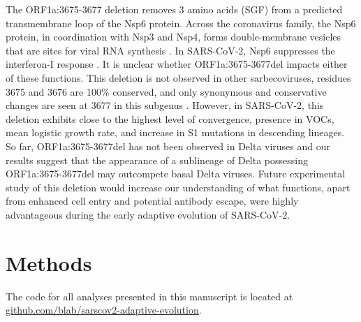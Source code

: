\documentclass[11pt,oneside,letterpaper]{article}
\begin{document}
The ORF1a:3675-3677 deletion removes 3 amino acids (SGF) from a predicted transmembrane loop \cite{Benvenuto2020-uc} of the Nsp6 protein.
Across the coronavirus family, the Nsp6 protein, in coordination with Nsp3 and Nsp4, forms double-membrane vesicles that are sites for viral RNA synthesis \cite{Snijder2020-vx}.
In SARS-CoV-2, Nsp6 suppresses the interferon-I response \cite{Xia2020-zs}. It is unclear whether ORF1a:3675-3677del impacts either of these functions.
This deletion is not observed in other sarbecoviruses, residues 3675 and 3676 are 100\% conserved, and only synonymous and conservative changes are seen at 3677 in this subgenus \cite{Jungreis2021-vv}.
However, in SARS-CoV-2, this deletion exhibits close to the highest level of convergence, presence in VOCs, mean logistic growth rate, and increase in S1 mutations in descending lineages.
So far, ORF1a:3675-3677del has not been observed in Delta viruses and our results suggest that the appearance of a sublineage of Delta possessing ORF1a:3675-3677del may outcompete basal Delta viruses.
Future experimental study of this deletion would increase our understanding of what functions, apart from enhanced cell entry and potential antibody escape, were highly advantageous during the early adaptive evolution of SARS-CoV-2.


\section*{Methods}
\sloppy
The code for all analyses presented in this manuscript is located at \href{https://github.com/blab/sarscov2-adaptive-evolution}{github.com/blab/sarscov2-adaptive-evolution}.
\end{document}
